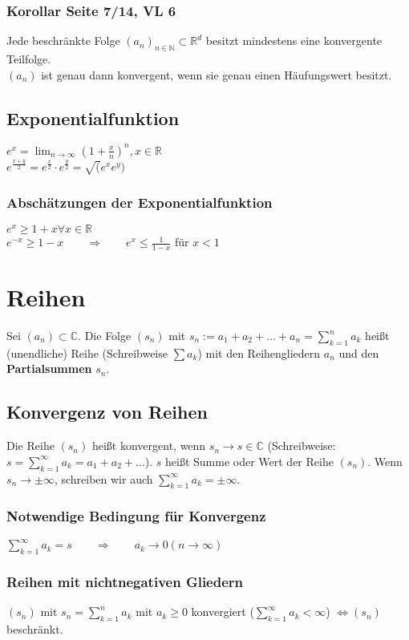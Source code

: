 \documentclass[10pt,a4paper^, twocolumn]{article}
\newcommand{\R}{\mathbb{R}}
\newcommand{\N}{\mathbb{N}}
\newcommand{\C}{\mathbb{C}}
\begin{document}
	\subsubsection{Korollar Seite 7/14, VL 6}
		Jede beschränkte Folge $(a_n)_{n \in \N} \subset \R^d$ besitzt
		mindestens eine konvergente Teilfolge.\\
		$(a_n)$ ist genau dann konvergent, wenn sie genau einen Häufungswert besitzt.	
	\subsection{Exponentialfunktion}
		$e^x = \lim_{n \to \infty} \left(1 + \frac{x}{n} \right)^n, x \in \R$\\
		$e^{\frac{x+y}{2}} = e^{\frac{x}{2}} \cdot e^{\frac{y}{2}} = \sqrt(e^xe^y)$
	\subsubsection{Abschätzungen der Exponentialfunktion}
		$e^x \geq 1 + x \forall x \in \R$\\
		$e^{-x} \geq 1 - x \qquad \Rightarrow \qquad e^x \leq \frac{1}{1-x}$ für $x < 1$ 
		

\section{Reihen}
	Sei $(a_n) \subset \C$. Die Folge $(s_n)$ mit 
	$s_n := a_1 + a_2 + \dots + a_n = \sum\limits_{k=1}^{n} a_k$ heißt (unendliche) Reihe
	(Schreibweise $\sum a_k$) mit den Reihengliedern $a_n$ und den \textbf{Partialsummen}
	$s_n$.
	\subsection{Konvergenz von Reihen}
		Die Reihe $(s_n)$ heißt konvergent, wenn $s_n \to s \in \C$
		(Schreibweise: $s = \sum\limits_{k=1}^{\infty} a_k = a_1 + a_2 + \dots$). 
		$s$ heißt Summe oder Wert der Reihe $(s_n)$.
		Wenn $s_n \to \pm \infty$, schreiben wir auch 
		$\sum\limits_{k=1}^{\infty} a_k = \pm \infty$.\\
		\subsubsection{Notwendige Bedingung für Konvergenz}
			$\sum\limits_{k=1}^{\infty} a_k = s 
			\qquad \Rightarrow \qquad 
			a_k \to 0 (n \to \infty)$
		\subsubsection{Reihen mit nichtnegativen Gliedern}
			$(s_n)$ mit $s_n = \sum\limits_{k=1}^{n} a_k$ mit $a_k \geq 0$ konvergiert 
			($\sum\limits_{k=1}^{\infty} a_k < \infty$) $\Leftrightarrow (s_n) $ beschränkt.
\end{document}
